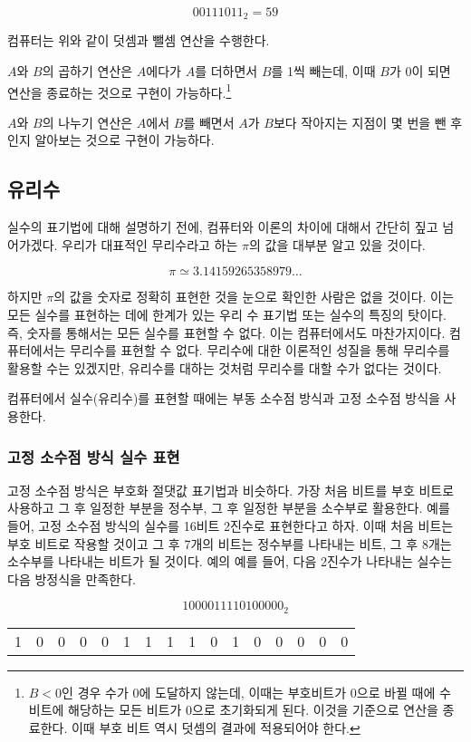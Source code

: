 \documentclass{article}
\begin{document}
$$
00111011_2 = 59
$$

컴퓨터는 위와 같이 덧셈과 뺄셈 연산을 수행한다.

$A$와 $B$의 곱하기 연산은 $A$에다가 $A$를 더하면서 $B$를 1씩 빼는데,
이때 $B$가 0이 되면 연산을
종료하는 것으로 구현이 가능하다.\footnote{$B < 0$인 경우 수가 0에 도달하지 않는데, 이때는
부호비트가 0으로 바뀔 때에 수 비트에 해당하는 모든 비트가 0으로 초기화되게 된다. 이것을 기준으로
연산을 종료한다. 이때 부호 비트 역시 덧셈의 결과에 적용되어야 한다.}

$A$와 $B$의 나누기 연산은 $A$에서 $B$를 빼면서 $A$가 $B$보다 작아지는 지점이 몇 번을 뺀
후인지 알아보는 것으로 구현이 가능하다.

\subsection{유리수}

실수의 표기법에 대해 설명하기 전에, 컴퓨터와 이론의 차이에 대해서 간단히 짚고 넘어가겠다.
우리가 대표적인 무리수라고 하는 $\pi$의 값을 대부분 알고 있을 것이다.

$$
\pi \simeq 3.14159265358979 \dots
$$

하지만 $\pi$의 값을 숫자로 정확히 표현한 것을 눈으로 확인한 사람은 없을 것이다.
이는 모든 실수를 표현하는 데에 한계가 있는 우리 수 표기법 또는 실수의 특징의 탓이다.
즉, 숫자를 통해서는 모든 실수를 표현할 수 없다. 이는 컴퓨터에서도 마찬가지이다.
컴퓨터에서는 무리수를 표현할 수 없다. 무리수에 대한 이론적인 성질을 통해 무리수를 활용할 수는
있겠지만, 유리수를 대하는 것처럼 무리수를 대할 수가 없다는 것이다.

컴퓨터에서 실수(유리수)를 표현할 때에는 부동 소수점 방식과 고정 소수점 방식을 사용한다.

\subsubsection{고정 소수점 방식 실수 표현}

고정 소수점 방식은 부호화 절댓값 표기법과 비슷하다. 가장 처음 비트를 부호 비트로 사용하고
그 후 일정한 부분을 정수부, 그 후 일정한 부분을 소수부로 활용한다.
예를 들어, 고정 소수점 방식의 실수를 16비트 2진수로 표현한다고 하자.
이때 처음 비트는 부호 비트로 작용할 것이고 그 후 7개의 비트는 정수부를 나타내는 비트,
그 후 8개는 소수부를 나타내는 비트가 될 것이다.
예의 예를 들어, 다음 2진수가 나타내는 실수는 다음 방정식을 만족한다.

$$
1 0000111 10100000_2
$$

\begin{center}
    \begin{tabular}{c|ccccccc|cccccccc}
        1 & 0 & 0 & 0 & 0 & 1 & 1 & 1 & 1 & 0 & 1 & 0 & 0 & 0 & 0 & 0
    \end{tabular}
\end{center}
\end{document}
